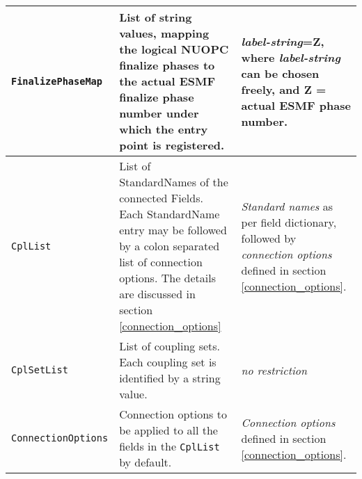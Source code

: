 \begin{longtable}{|p{}|p{}|p{}|}
     {\tt FinalizePhaseMap} & List of string values, mapping the logical NUOPC finalize phases to the actual ESMF finalize phase number under which the entry point is registered.& {\em label-string}=Z, where {\em label-string} can be chosen freely, and Z = actual ESMF phase number. \\ \hline
     {\tt CplList} & List of StandardNames of the connected Fields. Each StandardName entry may be followed by a colon separated list of connection options. The details are discussed in section \ref{connection_options} & {\em Standard names} as per field dictionary, followed by {\em connection options} defined in section \ref{connection_options}.\\ \hline
     {\tt CplSetList} & List of coupling sets. Each coupling set is identified by a string value.& {\em no restriction}\\ \hline
     {\tt ConnectionOptions} & Connection options to be applied to all the fields in the {\tt CplList} by default.& {\em Connection options} defined in section \ref{connection_options}.\\ \hline
     \hline
\end{longtable}
